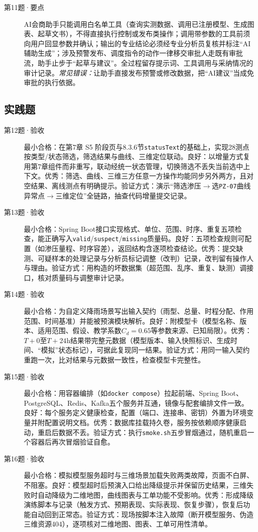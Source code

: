 \begin{description}
  \item[第11题·要点] AI会商助手只能调用白名单工具（查询实测数据、调用已注册模型、生成图表、起草文书），不得直接执行控制或发布类操作；调用带参数的工具前须向用户回显参数并确认；输出的专业结论必须经专业分析员复核并标注“AI辅助生成”；涉及预警发布、调度指令的动作一律移交审批人走既有审批流，助手止步于“起草与建议”。全过程留存提示词、工具调用与采纳情况的审计记录。\textit{常见错误：}让助手直接发布预警或修改数据，把“AI建议”当成免审批的执行依据。
\end{description}

\subsection*{实践题}
\begin{description}
  \item[第12题·验收] 最小合格：在第7章 S5 阶段页与8.3.6节\texttt{statusText}的基础上，实现28测点按类型/状态筛选，筛选结果与曲线、三维定位联动。良好：以增量方式复用第7章组件而非重写，联动经统一状态管理，切换筛选不丢失当前选中上下文。优秀：筛选、曲线、三维三方任意一方操作均能同步另外两方，且对空结果、离线测点有明确提示。验证方式：演示“筛选渗压$\rightarrow$选\texttt{PZ-07}曲线异常点$\rightarrow$三维定位”全链路，抽查代码增量提交记录。
  \item[第13题·验收] 最小合格：Spring Boot接口实现格式、单位、范围、时序、重复五项检查，能正确写入\texttt{valid}/\texttt{suspect}/\texttt{missing}质量码。良好：五项检查规则可配置（如渗压量程、时序容差），返回结构含逐项检查结论。优秀：提交缺测、可疑样本的处理记录与分析员标记调整（改判）记录，改判留有操作人与理由。验证方式：用构造的坏数据集（超范围、乱序、重复、缺测）调接口，核对质量码与调整审计记录。
  \item[第14题·验收] 最小合格：为自定义降雨场景写出输入契约（雨型、总量、时程分配、作用范围、时间基准）并能被预演模块解析。良好：附模型卡（模型名称、版本、适用范围、假设、教学系数$C_d=0.65$等参数来源、已知局限）。优秀：$T+0$至$T+24$h结果带完整元数据（模型版本、输入快照标识、生成时间、“模拟”状态标记），可据此复现同一结果。验证方式：用同一输入契约重跑一次，比对结果与元数据一致性，检查模型卡完整性。
  \item[第15题·验收] 最小合格：用容器编排（如\texttt{docker compose}）拉起前端、Spring Boot、PostgreSQL、Redis、Kafka五个服务并互通，镜像与配套编排文件一致。良好：每个服务定义健康检查，配置（端口、连接串、密钥）外置为环境变量并附配置说明文档。优秀：数据库挂载持久卷，服务按依赖顺序健康启动，重启后数据不丢。验证方式：执行\texttt{smoke.sh}五步冒烟通过，随机重启一个容器后再次冒烟验证自愈。
  \item[第16题·验收] 最小合格：模拟模型服务超时与三维场景加载失败两类故障，页面不白屏、不阻塞。良好：模型超时后预演入口给出降级提示并保留历史结果，三维失败时自动降级为二维地图，曲线图表与工单功能不受影响。优秀：形成降级演练脚本与记录（触发方式、预期表现、实际表现、恢复步骤），恢复后功能自动回到正常态。验证方式：现场按脚本注入故障（断开模型服务、伪造三维资源404），逐项核对二维地图、图表、工单可用性清单。
\end{description}

